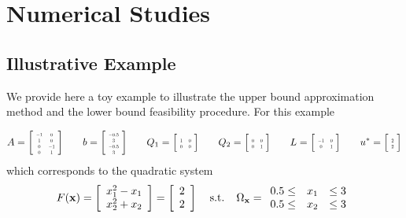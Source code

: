 \section{Numerical Studies} \label{sec:numstd}  
\subsection{Illustrative Example}
We provide here a toy example to illustrate the upper bound approximation method and the lower bound feasibility procedure. 
For this example

$$A=
\left[
\scalebox{0.5}{%
	\begin{tabular}{ c c }
	$-1$ & $0$  \\ 
	$1$ & $0$  \\  
	$0$ & $-1$ \\
	$0$ & $1$  
	\end{tabular}%
} 
\right] \hspace*{0.25in} b=
\left[
\scalebox{0.5}{%
	\begin{tabular}{ c }
	$-0.5$  \\ 
	$3$ \\  
	$-0.5$ \\
	$3$  
	\end{tabular}%
} 
\right] \hspace*{0.25in} Q_1=
\left[
\scalebox{0.5}{%
	\begin{tabular}{ c c }
	$1$ & $0$  \\ 
	$0$ & $0$  
	\end{tabular}%
} 
\right] \hspace*{0.25in} Q_2=
\left[
\scalebox{0.5}{%
	\begin{tabular}{ c c }
	$0$ & $0$  \\ 
	$0$ & $1$  
	\end{tabular}%
} 
\right] \hspace*{0.25in} L=
\left[
\scalebox{0.5}{%
	\begin{tabular}{ c c }
	$-1$ & $0$  \\ 
	$0$ & $1$  
	\end{tabular}%
} 
\right] \hspace*{0.25in} u^*=
\left[
\scalebox{0.5}{%
	\begin{tabular}{ c }
	$2$  \\ 
	$2$   
	\end{tabular}%
} 
\right]
$$
which corresponds to the quadratic system 
$$F(\mathbf{x})=\left[\begin{array}{r} x_1^2-x_1 \\ x_2^2+x_2 \end{array}\right]=\left[\begin{array}{r} 2 \\ 2 \end{array}\right] \hspace*{0.15in} \text{s.t.} \hspace*{0.15in} \Omega_{\mathbf{x}}=\begin{array}{rcl} 0.5\leq & x_1 & \leq 3 \\ 0.5\leq & x_2 & \leq 3 \end{array} $$

